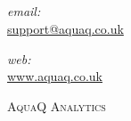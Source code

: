 \title{\mytitle}
\author{AquaQ Analytics}
\date{}

\begin{titlepage}

\begin{center}

\vspace {3.0cm}
\textsc{\seriestitle}\\[0.5cm]
\date{}
\HRule \\[0.7cm]
{ \huge \bf \mytitle}\\[0.4cm]

\HRule \\[1.5cm]

\begin{minipage}{0.4\textwidth}
\begin{flushleft} \large
\emph{email:}\\
\href{mailto:support@aquaq.co.uk}{support@aquaq.co.uk}
\end{flushleft}
\end{minipage}
\begin{minipage}{0.4\textwidth}
\begin{flushright} \large
\emph{web:}\\
\url{www.aquaq.co.uk}
\end{flushright}
\end{minipage}

\vspace {3.0cm}


\textsc{ \huge{AquaQ} Analytics}\\[1.5cm]

\end{center}
\end{titlepage}
